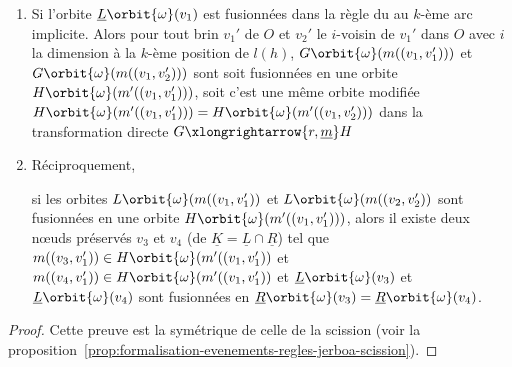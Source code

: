 \begin{proposition}
\begin{enumerate}
		\item Si l'orbite $\underline{L}\orbit{\omega}(v_1)$ est fusionnées dans la règle
		      du au $k$-ème arc implicite. Alors pour tout brin $v_1'$ de $O$ et
		      $v_2'$ le $i$-voisin de $v_1'$ dans $O$ avec $i$ la dimension à la
		      $k$-ème position de $l(h)$, $G\orbit{\omega}(m((v_1,v_1')))$ et
		      $G\orbit{\omega}(m((v_1,v_2')))$ sont soit fusionnées en une orbite
		      $H\orbit{\omega}(m'((v_1,v_1')))$, soit c'est une même orbite modifiée
		      $H\orbit{\omega}(m'((v_1,v_1'))) = H\orbit{\omega}(m'((v_1,v_2')))$ dans la
		      transformation directe $G \xlongrightarrow{r,\underline{m}} H$
		\item Réciproquement,

		      si les orbites $L\orbit{\omega}(m((v_1, v'_1))$ et
		      $L\orbit{\omega}(m((v_2, v'_2))$ sont fusionnées en une orbite
		      $H\orbit{\omega}(m'((v_1, v'_1)))$, alors il existe deux n\oe uds préservés
		      $v_3$ et $v_4$ (de $\underline{K} = \underline{L} \cap \underline{R}$)
		      tel que $m((v_3, v'_1)) \in H\orbit{\omega}(m'((v_1, v'_1))$ et
		      $m((v_4, v'_1)) \in H\orbit{\omega}(m'((v_1, v'_1))$ et
		      $\underline{L}\orbit{\omega}(v_3)$ et $\underline{L}\orbit{\omega}(v_4)$ sont
		      fusionnées en
		      $\underline{R}\orbit{\omega}(v_3) = \underline{R}\orbit{\omega}(v_4) $. %
	\end{enumerate}
\end{proposition}

\begin{proof}
	Cette preuve est la symétrique de celle de la scission (voir la proposition~\ref{prop:formalisation-evenements-regles-jerboa-scission}). %
\end{proof}


